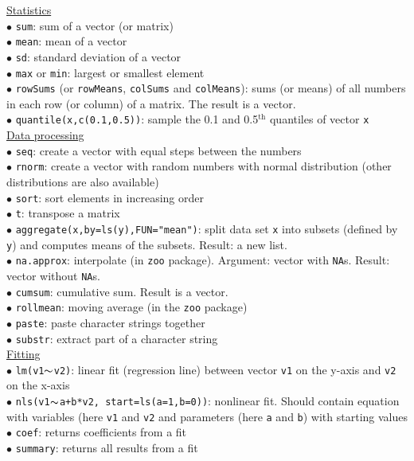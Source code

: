 \documentclass[a4paper,11pt,twocolumn,tablecaptionabove]{scrartcl}
\begin{document}
\noindent \underline{Statistics}\\
$\bullet$ \texttt{sum}: sum of a vector (or matrix)\\
$\bullet$ \texttt{mean}: mean of a vector\\
$\bullet$ \texttt{sd}: standard deviation of a vector\\
$\bullet$ \texttt{max} or \texttt{min}: largest or smallest element\\
$\bullet$ \texttt{rowSums} (or \texttt{rowMeans}, \texttt{colSums} and \texttt{colMeans}): 
sums (or means) of all numbers in each row (or column) of a matrix. The result is a vector.\\
$\bullet$ \texttt{quantile(x,c(0.1,0.5))}: sample the 0.1 and 0.5$\mathrm{^{th}}$ quantiles of vector \texttt{x}\\

\noindent \underline{Data processing}\\
$\bullet$ \texttt{seq}: create a vector with equal steps between the numbers\\
$\bullet$ \texttt{rnorm}: create a vector with random numbers with normal distribution (other distributions are also available)\\
$\bullet$ \texttt{sort}: sort elements in increasing order\\
$\bullet$ \texttt{t}: transpose a matrix\\
$\bullet$ \texttt{aggregate(x,by=ls(y),FUN="mean")}: split data set \texttt{x} into subsets (defined by \texttt{y}) and computes means of the subsets. Result: a new list.\\
$\bullet$ \texttt{na.approx}: interpolate (in \texttt{zoo} package). Argument: vector with \texttt{NA}s. Result: vector without \texttt{NA}s.\\
$\bullet$ \texttt{cumsum}: cumulative sum. Result is a vector.\\
$\bullet$ \texttt{rollmean}: moving average (in the \texttt{zoo} package)\\
$\bullet$ \texttt{paste}: paste character strings together\\
$\bullet$ \texttt{substr}: extract part of a character string\\

\noindent \underline{Fitting}\\
$\bullet$ \texttt{lm(v1}$\thicksim$\texttt{v2)}: linear fit (regression line) between vector \texttt{v1} on the y-axis and \texttt{v2} on the x-axis\\
$\bullet$ \texttt{nls(v1}$\thicksim$\texttt{a+b*v2, start=ls(a=1,b=0))}: nonlinear fit. Should contain equation with variables (here \texttt{v1} and \texttt{v2} and parameters (here \texttt{a} and \texttt{b}) with starting values\\
$\bullet$ \texttt{coef}: returns coefficients from a fit\\
$\bullet$ \texttt{summary}: returns all results from a fit\\
\end{document}
